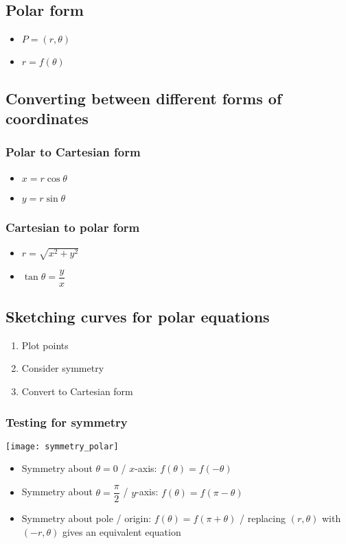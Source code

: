 \subsection{Polar form}
\begin{itemize}
	\item $P=(r,\theta)$
	\item $r=f(\theta)$
\end{itemize}

\subsection{Converting between different forms of coordinates}
\subsubsection{Polar to Cartesian form}
\begin{itemize}
	\item $x=r\cos\theta$
	\item $y=r\sin\theta$
\end{itemize}
\subsubsection{Cartesian to polar form}
\begin{itemize}
	\item $r=\sqrt{x^2+y^2}$
	\item $\tan\theta=\dfrac{y}{x}$
\end{itemize}


\subsection{Sketching curves for polar equations}
\begin{enumerate}
	\item Plot points
	\item Consider symmetry
	\item Convert to Cartesian form
\end{enumerate}

\subsubsection{Testing for symmetry}
\texttt{[image: symmetry\_polar]}
\begin{itemize}
	\item Symmetry about $\theta=0$ / $x$-axis: $f(\theta)=f(-\theta)$
	\item Symmetry about $\theta=\dfrac{\pi}{2}$ / $y$-axis: $f(\theta)=f(\pi-\theta)$
	\item Symmetry about pole / origin: $f(\theta)=f(\pi+\theta)$ / replacing $(r,\theta)$ with $(-r,
	\theta)$ gives an equivalent equation
\end{itemize}


